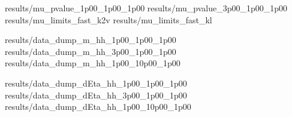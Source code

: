 {results/mu_pvalue_1p00_1p00_1p00}
{results/mu_pvalue_3p00_1p00_1p00}
{results/mu_limits_fast_k2v}
{results/mu_limits_fast_kl}

{results/data_dump_m_hh_1p00_1p00_1p00}
{results/data_dump_m_hh_3p00_1p00_1p00}
{results/data_dump_m_hh_1p00_10p00_1p00}

{results/data_dump_dEta_hh_1p00_1p00_1p00}
{results/data_dump_dEta_hh_3p00_1p00_1p00}
{results/data_dump_dEta_hh_1p00_10p00_1p00}
